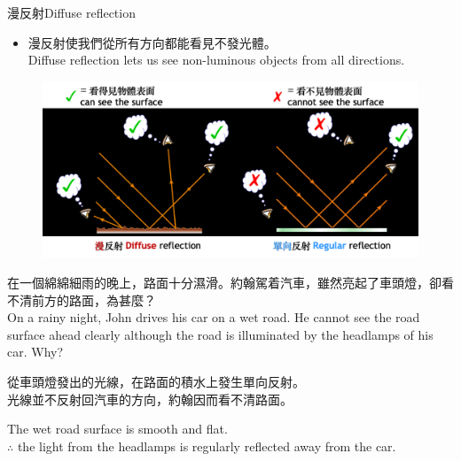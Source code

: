 \documentclass[beamer=true]{standalone}
\begin{document}
\begin{frame}{漫反射Diffuse reflection}
    \begin{itemize}
        \item 漫反射使我們從所有方向都能看見不發光體。\\Diffuse reflection lets us see non-luminous objects from all directions.
    \end{itemize}
    \begin{figure}
        \centering
        \includegraphics[width=1\linewidth]{assets/djdioqwdjqodjqwoidj.png}
        
        
    \end{figure}
\end{frame}

\begin{eg}
    在一個綿綿細雨的晚上，路面十分濕滑。約翰駕着汽車，雖然亮起了車頭燈，卻看不清前方的路面，為甚麼？\\On a rainy night, John drives his car on a wet road. He cannot see the road surface ahead clearly although the road is illuminated by the headlamps of his car. Why?
    \begin{tasks}
        \task [sol.] 從車頭燈發出的光線，在路面的積水上發生單向反射。\\
	光線並不反射回汽車的方向，約翰因而看不清路面。\par The wet road surface is smooth and flat.
	\\$\therefore$ the light from the headlamps is regularly reflected away from the car.
    \end{tasks}
\end{eg}
\end{document}
